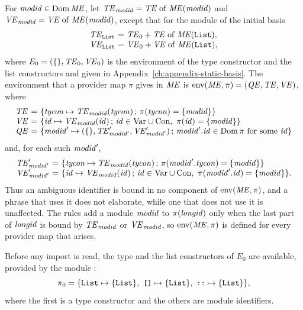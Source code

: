 For $\mathit{modid} \in \mathrm{Dom}\,\mathit{ME}$, let $\mathit{TE}_{\mathit{modid}} = \mathit{TE} \mathrel{\mathrm{of}} \mathit{ME}(\mathit{modid})$ and
$\mathit{VE}_{\mathit{modid}} = \mathit{VE} \mathrel{\mathrm{of}} \mathit{ME}(\mathit{modid})$, except that for the module 
of the initial basis
\[
\begin{array}{@{}l@{\ =\ }l@{}}
  \TE_{\kw{List}} & \TE_0 + \TE \of \ME(\kw{List}),\\
  \VE_{\kw{List}} & \VE_0 + \VE \of \ME(\kw{List}),
\end{array}
\]
where $E_0 = (\{\}, \mathit{TE}_0, \mathit{VE}_0)$ is the environment of the type
constructor  and the list constructors \kw{[]} and \kw{::} given in
Appendix~\ref{ch:appendix-static-basis}. %
The environment that a
provider map $\pi$ gives in $\mathit{ME}$ is $\mathrm{env}(\mathit{ME}, \pi) = (\mathit{QE}, \mathit{TE}, \mathit{VE})$, where
\[
\begin{array}{@{}l@{\ =\ }l@{}}
  \TE & \{\tycon \mapsto \TE_{\modid}(\tycon) \,;\, \pi(\tycon) = \{\modid\}\}\\
  \VE & \{\smid \mapsto \VE_{\modid}(\smid) \,;\, \smid \in \cls{Var} \cup \cls{Con},\
        \pi(\smid) = \{\modid\}\}\\
  \QE & \{\modid' \mapsto (\emptymap, \TE_{\modid'}', \VE_{\modid'}') \,;\,
        \modid'.\smid \in \Dom\pi \text{ for some } \smid\}
\end{array}
\]
and, for each such $\mathit{modid}'$,
\[
\begin{array}{@{}l@{\ =\ }l@{}}
  \TE_{\modid'}' & \{\tycon \mapsto \TE_{\modid}(\tycon) \,;\,
        \pi(\modid'.\tycon) = \{\modid\}\}\\
  \VE_{\modid'}' & \{\smid \mapsto \VE_{\modid}(\smid) \,;\,
        \smid \in \cls{Var} \cup \cls{Con},\ \pi(\modid'.\smid) = \{\modid\}\}.
\end{array}
\]
Thus an ambiguous identifier is bound in no component of $\mathrm{env}(\mathit{ME}, \pi)$, and
a phrase that uses it does not elaborate, while one that does not use it is
unaffected. %
The rules add a module $\mathit{modid}$ to $\pi(\mathit{longid})$ only when the last part of
$\mathit{longid}$ is bound by $\mathit{TE}_{\mathit{modid}}$ or $\mathit{VE}_{\mathit{modid}}$, so $\mathrm{env}(\mathit{ME}, \pi)$
is defined for every provider map that arises.

Before any import is read, the type  and the list constructors of
$E_0$ are available, provided by the module \kw{List}:
\[
  \pi_0 = \{\kw{List} \mapsto \{\kw{List}\},\ \kw{[]} \mapsto \{\kw{List}\},\
  \kw{::} \mapsto \{\}\},
\]
where the first \kw{List} is a type constructor and the others are module
identifiers.

